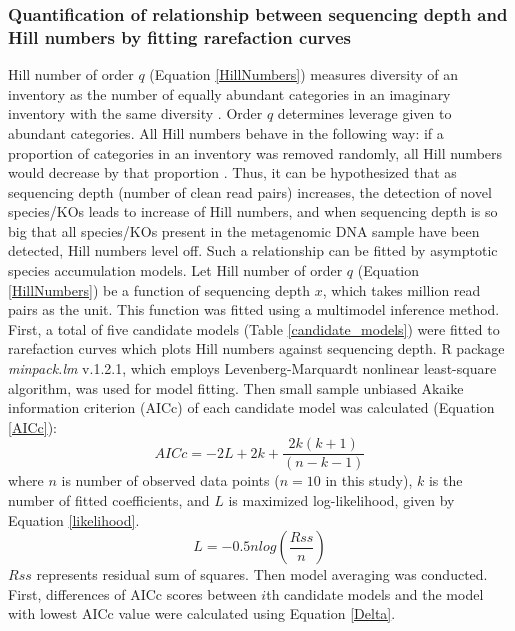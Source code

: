 \documentclass[11pt]{article}
\begin{document}
      \subsubsection{Quantification of relationship between sequencing depth and Hill numbers by fitting rarefaction curves}
      Hill number of order $q$ (Equation \ref{HillNumbers}) measures diversity of an inventory as the number of equally abundant categories in an imaginary inventory with the same diversity \citep{chao2014unifying,roswell2021conceptual}. 
      Order $q$ determines leverage given to abundant categories. 
      All Hill numbers behave in the following way: if a proportion of categories in an inventory was removed randomly, all Hill numbers would decrease by that proportion \citep{roswell2021conceptual}. 
      Thus, it can be hypothesized that as sequencing depth (number of clean read pairs) increases, the detection of novel species/KOs leads to increase of Hill numbers, and when sequencing depth is so big that all species/KOs present in the metagenomic DNA sample have been detected, Hill numbers level off. 
      Such a relationship can be fitted by asymptotic species accumulation models.
      \newline
      Let Hill number of order $q$ (Equation \ref{HillNumbers}) be a function of sequencing depth $x$, which takes million read pairs as the unit. 
      This function was fitted using a multimodel inference method. 
      First, a total of five candidate models (Table \ref{candidate_models}) were fitted to rarefaction curves which plots Hill numbers against sequencing depth. 
      R package \textit{minpack.lm} v.1.2.1, which employs Levenberg-Marquardt nonlinear least-square algorithm, was used for model fitting. 
      Then small sample unbiased Akaike information criterion (AICc) \citep{anderson2007model} of each candidate model was calculated (Equation \ref{AICc}):
      \begin{equation}
        AICc = -2L+2k+\frac{2k(k+1)}{(n-k-1)}
        \label{AICc}
      \end{equation}
      where $n$ is number of observed data points ($n = 10$ in this study), $k$ is the number of fitted coefficients, and $L$ is maximized log-likelihood, given by Equation \ref{likelihood}.
      \begin{equation}
        L = -0.5nlog(\frac{Rss}{n})
        \label{likelihood}
      \end{equation}
      $Rss$ represents residual sum of squares.
      \newline
      Then model averaging was conducted. First, differences of AICc scores between $i$th candidate models and the model with lowest AICc value were calculated using Equation \ref{Delta}.
\end{document}
